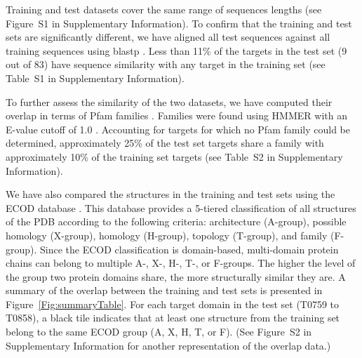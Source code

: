 \documentclass{bioinfo}
\begin{document}
%
Training and test datasets cover the same range of sequences
lengths (see Figure~S1 in Supplementary Information). To confirm that the
training and test sets are significantly different, we have aligned
all test sequences against all training sequences using
blastp \citep{altschul1990basic}.  Less than 11\% of the targets in the
test set (9 out of 83) have sequence similarity with any target in the
training set (see Table~S1 in Supplementary Information).

To further assess the similarity of the two datasets, we have computed
their overlap in terms of Pfam families \citep{finn2016pfam}. 
Families were found using HMMER \citep{finn2015hmmer} with an E-value
cutoff of 1.0 \citep{finn2016pfam}.  Accounting for targets for which
no Pfam family could be determined, approximately 25\% of the test set
targets share a family with approximately 10\% of the training set
targets (see Table~S2 in Supplementary Information).

We have also compared the structures in the training and test sets
using the ECOD database \citep{cheng2014ecod}. This database provides a
5-tiered classification of all structures of the PDB
\citep{berman2000protein} according to the following criteria:
architecture (A-group), possible homology (X-group), homology
(H-group), topology (T-group), and family (F-group).  Since the ECOD
classification is domain-based, multi-domain protein chains can belong
to multiple A-, X-, H-, T-, or F-groups.  The higher the level of the group two
protein domains share, the more structurally similar they are.
%
A summary of the overlap between the training and test sets is
presented in Figure~\ref{Fig:summaryTable}. For each target domain in
the test set (T0759 to T0858), a black tile indicates that at least
one structure from the training set belong to the same ECOD group (A,
X, H, T, or F). (See Figure~S2 in Supplementary Information for another
representation of the overlap data.)
%
%
\end{document}
